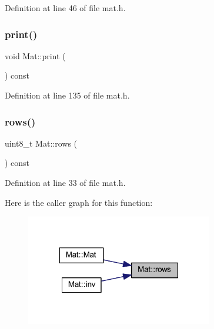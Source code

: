 Definition at line 46 of file mat.\+h.

\mbox{\label{class_mat_af08e1d54e7ec9d23663a65591634be0d}} 
\subsubsection{\texorpdfstring{print()}{print()}}
{\footnotesize\ttfamily void Mat\+::print (\begin{DoxyParamCaption}{ }\end{DoxyParamCaption}) const\hspace{0.3cm}{\ttfamily [inline]}}



Definition at line 135 of file mat.\+h.

\mbox{\label{class_mat_a5b965c2e37939da2aea0af686209655c}} 
\subsubsection{\texorpdfstring{rows()}{rows()}}
{\footnotesize\ttfamily uint8\+\_\+t Mat\+::rows (\begin{DoxyParamCaption}{ }\end{DoxyParamCaption}) const\hspace{0.3cm}{\ttfamily [inline]}}



Definition at line 33 of file mat.\+h.

Here is the caller graph for this function\+:
\nopagebreak
\begin{figure}[H]
\begin{center}
\leavevmode
\includegraphics[width=231pt]{class_mat_a5b965c2e37939da2aea0af686209655c_icgraph}
\end{center}
\end{figure}
\mbox{\label{class_mat_af942681667806bc48eecd8f793e35c3b}} 
